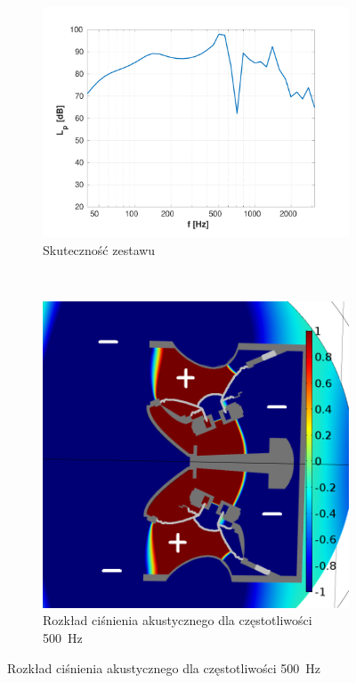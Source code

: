 \documentclass[12pt]{oska}
\begin{document}
	\begin{figure}[!ht]
		\centering
		\begin{subfigure}[b]{.49\textwidth}
			\includegraphics[width=\textwidth,trim={1.25cm .5cm 2cm 1cm},clip]{skutecznosc_comsol.pdf}
			\caption{Skuteczność zestawu}
			\label{r:C_skutecznosc}
		\end{subfigure}
		~
		\begin{subfigure}[b]{.49\textwidth}
			\includegraphics[width=\textwidth]{pres_sig_500Hz_02.png}
			\caption{Rozkład ciśnienia akustycznego dla częstotliwości \SI{500}{\hertz}}
			\label{r:C_500}
		\end{subfigure}
		

\end{figure}
\end{document}
